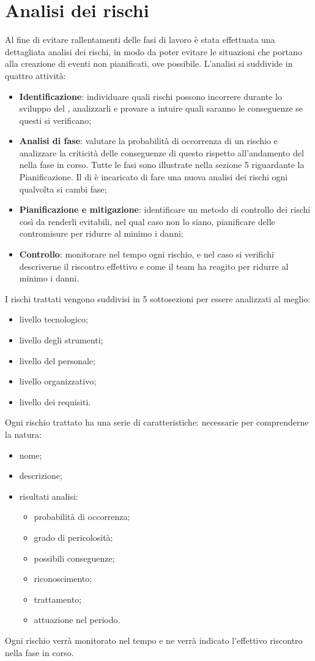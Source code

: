 \documentclass[PianoDiProgetto.tex]{subfiles}
\begin{document}
\section{Analisi dei rischi}
Al fine di evitare rallentamenti delle fasi di lavoro è stata effettuata una dettagliata analisi dei rischi, in modo da poter evitare le situazioni che portano alla creazione di eventi non pianificati, ove possibile. L'analisi si suddivide in quattro attività:
	\begin{itemize}
		\item \textbf{Identificazione}: individuare quali rischi possono incorrere durante lo sviluppo del , analizzarli e provare a intuire quali saranno le conseguenze se questi si verificano;
		\item \textbf{Analisi di fase}: valutare la probabilità di occorrenza di un rischio e analizzare la criticità delle conseguenze di questo rispetto all'andamento del  nella fase in corso. Tutte le fasi sono illustrate nella sezione 5 riguardante la Pianificazione. Il \RESP{} di  è incaricato  di fare una nuova analisi dei rischi ogni qualvolta si cambi fase;
		\item \textbf{Pianificazione e mitigazione}: identificare un metodo di controllo dei rischi così da renderli evitabili, nel qual caso non lo siano, pianificare delle contromisure per ridurre al minimo i danni; 
		\item \textbf{Controllo}: monitorare nel tempo ogni rischio, e nel caso si verifichi descriverne il riscontro effettivo e come il team ha reagito per ridurre al minimo i danni. 
	\end{itemize}
I rischi trattati vengono suddivisi in 5 sottosezioni per essere analizzati al meglio:
	\begin{itemize}
		\item livello tecnologico;
		\item livello degli strumenti;
		\item livello del personale;
		\item livello organizzativo;
		\item livello dei requisiti.
	\end{itemize}
Ogni rischio trattato ha una serie di caratteristiche: necessarie per comprenderne la natura:
	\begin{itemize}
		\item nome;
		\item descrizione;
		\item risultati analisi:
			\begin{itemize}
				\item probabilità di occorrenza;
				\item grado di pericolosità;
				\item possibili conseguenze;
				\item riconoscimento;
				\item trattamento;
				\item attuazione nel periodo.
			\end{itemize}
	\end{itemize}
Ogni rischio verrà monitorato nel tempo e ne verrà indicato l’effettivo riscontro nella fase in corso.
\end{document}

